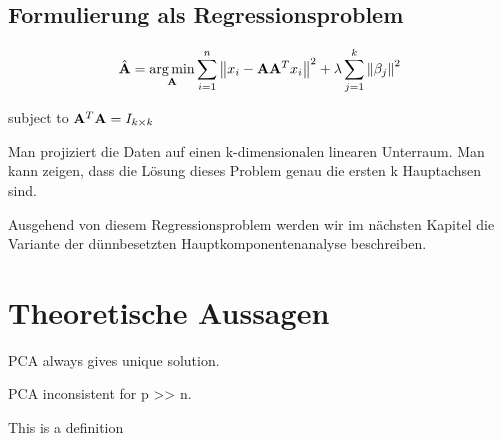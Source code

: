 \subsection{Formulierung als Regressionsproblem}
$$\hat{\mathbf{A}} = \operatorname*{arg\,min}_{\mathbf{A}} \sum_{i=1}^{n} \left\lVert x_i - \mathbf{A}\mathbf{A}^Tx_i \right\rVert^2 + \lambda \sum_{j=1}^{k}\left\lVert \beta_j \right\rVert^2$$

subject to $\mathbf{A}^T\mathbf{A} = I_{k \times k}$

\cite{zou_sparsepca}

Man projiziert die Daten auf einen k-dimensionalen linearen Unterraum. Man kann zeigen, dass die Lösung dieses Problem genau die ersten k Hauptachsen sind.

Ausgehend von diesem Regressionsproblem werden wir im nächsten Kapitel die Variante der dünnbesetzten Hauptkomponentenanalyse beschreiben.

\section{Theoretische Aussagen}

\begin{thm}
PCA always gives unique solution.
\end{thm}

\begin{thm}
PCA inconsistent for p >> n.
\end{thm}

\begin{defn}
This is a definition
\end{defn}